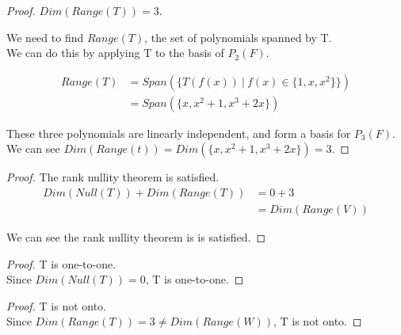 \documentclass[12pt]{article}
\newenvironment{exercise}[2][Exercise]{\begin{trivlist}
\item[\hskip \labelsep{\bfseries #1}\hskip \labelsep{\bfseries #2.}]}{\end{trivlist}}
\begin{document}
\begin{exercise}{2.1.5}
    \begin{proof} $Dim(Range(T)) = 3$.

        \noindent We need to find $Range(T)$, the set of polynomials spanned by T. \\

        \noindent We can do this by applying T to the basis of $P_2(F)$.

        \begin{align*}
            Range(T) 
            & = Span(\{T(f(x))\ |\ f(x) \in \{1, x, x^2\}\}) \\
            & = Span(\{x, x^2 + 1, x^3 + 2x\})
        \end{align*}
        
        \noindent These three polynomials are linearly independent, and form a basis for $P_3(F)$.
        We can see $Dim(Range(t)) = Dim(\{x, x^2 + 1, x^3 + 2x\}) = 3$.

    \end{proof}

    \begin{proof} The rank nullity theorem is satisfied. \\

        \begin{align*}
            Dim(Null(T)) + Dim(Range(T))
            & = 0 + 3 \\
            & = Dim(Range(V))
        \end{align*}
        
        \noindent We can see the rank nullity theorem is is satisfied.

    \end{proof}

    \begin{proof} T is one-to-one. \\

        \noindent Since $Dim(Null(T)) = 0$, T is one-to-one.

    \end{proof}

    \begin{proof} T is not onto. \\

        \noindent Since $Dim(Range(T)) = 3 \neq Dim(Range(W))$, T is not onto.

    \end{proof}

\end{exercise}
\end{document}
